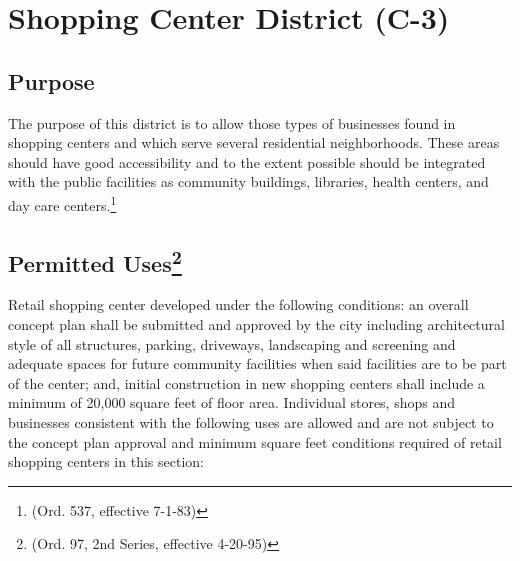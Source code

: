 \section{Shopping Center District (C-3)}
\subsection{Purpose}
The purpose of this district is to allow those types of businesses found in shopping centers and which serve several residential neighborhoods. These areas should have good accessibility and to the extent possible should be integrated with the public facilities as community buildings, libraries, health centers, and day care centers.\footnote{(Ord. 537, effective 7-1-83)}
\subsection{Permitted Uses\footnote{(Ord. 97, 2nd Series, effective 4-20-95)}}
Retail shopping center developed under the following conditions: an overall concept plan shall be submitted and approved by the city including architectural style of all structures, parking, driveways, landscaping and screening and adequate spaces for future community facilities when said facilities are to be part of the center; and, initial construction in new shopping centers shall include a minimum of 20,000 square feet of floor area. Individual stores, shops and businesses consistent with the following uses are allowed and are not subject to the concept plan approval and minimum square feet conditions required of retail shopping centers in this section:
